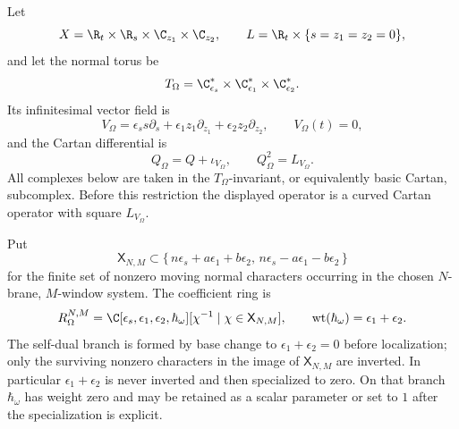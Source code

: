 \begin{defn}
\label{def:app-normal-omega-costello-kernel-datum}
  Let
  \[
    X=\R_t\times\R_s\times\C_{z_1}\times\C_{z_2},
    \qquad
    L=\R_t\times\{s=z_1=z_2=0\},
  \]
  and let the normal torus be
  \[
    T_\Omega=
    \C^*_{\epsilon_s}\times
    \C^*_{\epsilon_1}\times
    \C^*_{\epsilon_2}.
  \]
  Its infinitesimal vector field is
  \[
    V_\Omega=
      \epsilon_s s\partial_s
      +\epsilon_1z_1\partial_{z_1}
      +\epsilon_2z_2\partial_{z_2},
    \qquad V_\Omega(t)=0,
  \]
  and the Cartan differential is
  \[
    Q_\Omega=Q+\iota_{V_\Omega},
    \qquad
    Q_\Omega^2=L_{V_\Omega}.
  \]
  All complexes below are taken in the \(T_\Omega\)-invariant, or
  equivalently basic Cartan, subcomplex.  Before this restriction the
  displayed operator is a curved Cartan operator with square \(L_{V_\Omega}\).

  Put
  \[
    \mathsf X_{N,M}
      \subset
    \{\,n\epsilon_s+a\epsilon_1+b\epsilon_2,\,
        n\epsilon_s-a\epsilon_1-b\epsilon_2\,\}
  \]
  for the finite set of nonzero moving normal characters occurring in the
  chosen \(N\)-brane, \(M\)-window system.  The coefficient ring is
  \[
    R_\Omega^{N,M}
      =
    \C[\epsilon_s,\epsilon_1,\epsilon_2,\hbar_\omega]
      [\chi^{-1}\mid\chi\in\mathsf X_{N,M}],
    \qquad
    \operatorname{wt}(\hbar_\omega)=
      \epsilon_1+\epsilon_2 .
  \]
  The self-dual branch is formed by base change to
  \(\epsilon_1+\epsilon_2=0\) before localization; only the surviving
  nonzero characters in the image of \(\mathsf X_{N,M}\) are inverted.
  In particular \(\epsilon_1+\epsilon_2\) is never inverted and then
  specialized to zero.  On that branch \(\hbar_\omega\) has weight zero
  and may be retained as a scalar parameter or set to \(1\) after the
  specialization is explicit.


\end{defn}
